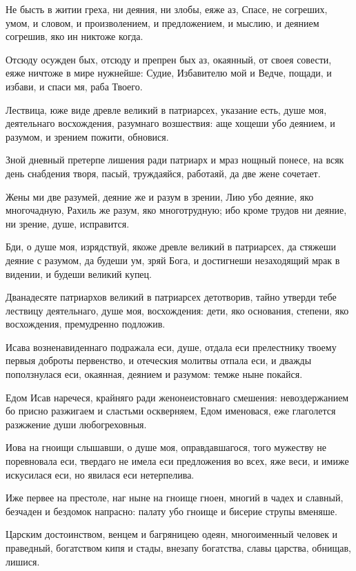Не бысть в житии греха, ни деяния, ни злобы, еяже аз, Спасе, не согреших, умом, и словом, и произволением, и предложением, и мыслию, и деянием согрешив, яко ин никтоже когда.


Отсюду осужден бых, отсюду и препрен бых аз, окаянный, от своея совести, еяже ничтоже в мире нужнейше: Судие, Избавителю мой и Ведче, пощади, и избави, и спаси мя, раба Твоего.


Лествица, юже виде древле великий в патриарсех, указание есть, душе моя, деятельнаго восхождения, разумнаго возшествия: аще хощеши убо деянием, и разумом, и зрением пожити, обновися.


Зной дневный претерпе лишения ради патриарх и мраз нощный понесе, на всяк день снабдения творя, пасый, труждаяйся, работаяй, да две жене сочетает.


Жены ми две разумей, деяние же и разум в зрении, Лию убо деяние, яко многочадную, Рахиль же разум, яко многотрудную; ибо кроме трудов ни деяние, ни зрение, душе, исправится.


Бди, о душе моя, изрядствуй, якоже древле великий в патриарсех, да стяжеши деяние с разумом, да будеши ум, зряй Бога, и достигнеши незаходящий мрак в видении, и будеши великий купец.


Дванадесяте патриархов великий в патриарсех детотворив, тайно утверди тебе лествицу деятельнаго, душе моя, восхождения: дети, яко основания, степени, яко восхождения, премудренно подложив.


Исава возненавиденнаго подражала еси, душе, отдала еси прелестнику твоему первыя доброты первенство, и отеческия молитвы отпала еси, и дважды поползнулася еси, окаянная, деянием и разумом: темже ныне покайся.


Едом Исав наречеся, крайняго ради женонеистовнаго смешения: невоздержанием бо присно разжигаем и сластьми оскверняем, Едом именовася, еже глаголется разжжение души любогреховныя.


Иова на гноищи слышавши, о душе моя, оправдавшагося, того мужеству не поревновала еси, твердаго не имела еси предложения во всех, яже веси, и имиже искусилася еси, но явилася еси нетерпелива.


Иже первее на престоле, наг ныне на гноище гноен, многий в чадех и славный, безчаден и бездомок напрасно: палату убо гноище и бисерие струпы вменяше.


Царским достоинством, венцем и багряницею одеян, многоименный человек и праведный, богатством кипя и стады, внезапу богатства, славы царства, обнищав, лишися.


